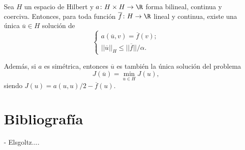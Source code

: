 \documentclass{article}
\begin{document}
\begin{theorem}
  \label{thm:lax-milgram}
  Sea $H$ un espacio de Hilbert y $a \colon H \times H \to \R$ forma bilineal, continua y
  coerciva. Entonces, para toda función $\overline{f} \colon H \to \R$ lineal y continua, existe una
  única $\overline{u} \in H$ solución de
  \begin{equation}
    \label{eq:lax-milgram}
    \begin{cases}
      a(\overline{u}, v) = \overline{f}(v); \\
      ||\overline{u}||_H \le || \overline{f} || / \alpha.
    \end{cases}
    \tag{PD}
  \end{equation}

  Además, si $a$ es simétrica, entonces $\overline{u}$ es también la única solución del problema
  \begin{equation}
    \label{eq:lax-milgram:pv}
    J(\overline{u}) = \min_{u \in H} J(u),
    \tag{PV}
  \end{equation}
  siendo $J(u) = a(u,u)/2 - \overline{f}(u)$.
\end{theorem}


\section{Bibliografía}

- Elsgoltz....
\end{document}
